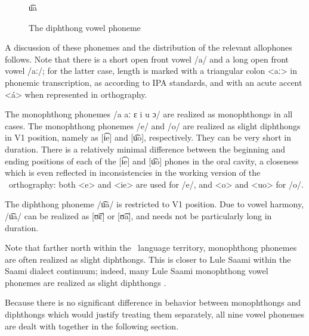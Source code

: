 \begin{figure}[t]
\centering
u͡a %
\caption[Diphthong inventory]{The diphthong vowel phoneme} \label{diphthongs}
\end{figure}

A discussion of these phonemes and the distribution of the relevant allophones follows. 
Note that there is a short open front vowel /a/ and a long open front vowel /aː/; for the latter case, length is marked with a triangular colon <aː> in phonemic transcription, as according to IPA standards, and with an acute accent <á> when represented in orthography.

The monophthong phonemes /a aː ɛ i u ɔ/ are realized as monophthongs in all cases. 
The monophthong phonemes /e/ and /o/ are realized as slight diphthongs in V1 position, namely as [i͡e] and [u͡o], %
respectively. They can be very short in duration. There is a relatively minimal difference between the beginning and ending positions of each of the [i͡e] and [u͡o] phones in the oral cavity, a closeness which is even reflected in inconsistencies in the working version of the \PS\ orthography: both <e> and <ie> are used for /e/, and <o> and <uo> for /o/. 

The diphthong phoneme /u͡a/ is restricted to V1 position. Due to vowel harmony, /u͡a/ can be realized as [ʊ͡ɛ] or [ʊ͡a], and needs not be particularly long in duration. 

Note that farther north within the \PS\ language territory, monophthong phonemes are often realized as slight diphthongs. This is closer to Lule Saami within the Saami dialect continuum; indeed, many Lule Saami monophthong vowel phonemes are realized as slight diphthongs \citep[cf., e.g.,][11]{Spiik1989}. 

Because there is no significant difference in behavior between monophthongs and diphthongs which would justify treating them separately, all nine vowel phonemes are dealt with together in the following section.


